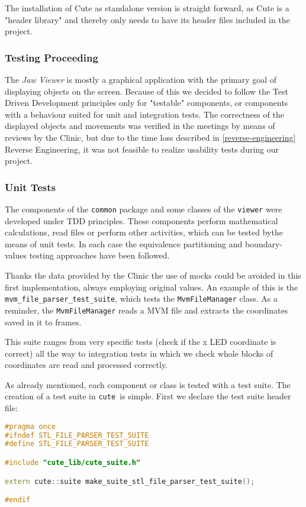 The installation of Cute as standalone version is straight forward, as Cute is a "header library" and thereby only needs to have its header files included in the project.

\subsubsection{Testing Proceeding}

The \emph{Jaw Viewer} is mostly a graphical application with the primary goal of displaying objects on the screen. Because of this we decided to follow the Test Driven Development principles only for "testable" components, or components with a behaviour suited for unit and integration tests. The correctness of the displayed objects and movements was verified in the meetings by means of reviews by the Clinic, but due to the time loss described in \ref{reverse-engineering} Reverse Engineering, it was not feasible to realize usability tests during our project.

\subsubsection{Unit Tests}

The components of the \verb|common| package and some classes of the \verb|viewer| were developed under TDD principles. These components perform mathematical calculations, read files or perform other activities, which can be tested bythe  means of unit tests. In each case the equivalence partitioning and boundary-values testing approaches have been followed. 

Thanks the data provided by the Clinic the use of mocks could be avoided in this first implementation, always employing original values. An example of this is the \verb|mvm_file_parser_test_suite|, which tests the \verb|MvmFileManager| class. As a reminder, the \verb|MvmFileManager| reads a MVM file and extracts the coordinates saved in it to \glspl{frame}.

\noindent This suite ranges from very specific tests (check if the x LED coordinate is correct) all the way to integration tests in which we check whole blocks of coordinates are read and processed correctly.

As already mentioned, each component or class is tested with a test suite. The creation of a test suite in \verb|cute |is simple. First we declare the test suite header file:


\begin{lstlisting}[language=C++, caption=Test Suite header file]
#pragma once
#ifndef STL_FILE_PARSER_TEST_SUITE
#define STL_FILE_PARSER_TEST_SUITE

#include "cute_lib/cute_suite.h"

extern cute::suite make_suite_stl_file_parser_test_suite();

#endif
\end{lstlisting}

